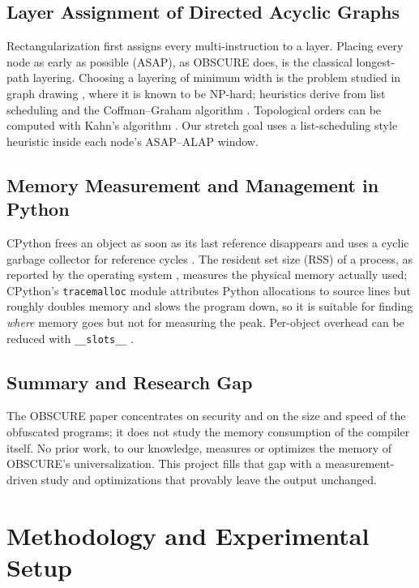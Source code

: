 \documentclass[12pt,a4paper,oneside]{report}
\newcommand{\code}[1]{\texttt{#1}}
\begin{document}
\section{Layer Assignment of Directed Acyclic Graphs}
Rectangularization first assigns every multi-instruction to a layer. Placing every node as early
as possible (ASAP), as OBSCURE does, is the classical longest-path layering. Choosing a layering of
minimum width is the problem studied in graph drawing \cite{sugiyama, healy}, where it is known to
be NP-hard; heuristics derive from list scheduling \cite{graham} and the Coffman--Graham algorithm
\cite{coffman}. Topological orders can be computed with Kahn's algorithm \cite{kahn}. Our stretch
goal uses a list-scheduling style heuristic inside each node's ASAP--ALAP window.

\section{Memory Measurement and Management in Python}
CPython frees an object as soon as its last reference disappears and uses a cyclic garbage
collector for reference cycles \cite{pygc}. The resident set size (RSS) of a process, as reported
by the operating system \cite{getrusage, procfs}, measures the physical memory actually used;
CPython's \code{tracemalloc} module \cite{tracemalloc} attributes Python allocations to source
lines but roughly doubles memory and slows the program down, so it is suitable for finding
\emph{where} memory goes but not for measuring the peak. Per-object overhead can be reduced with
\code{\_\_slots\_\_} \cite{pyslots}.

\section{Summary and Research Gap}
The OBSCURE paper concentrates on security and on the size and speed of the obfuscated programs; it
does not study the memory consumption of the compiler itself. No prior work, to our knowledge,
measures or optimizes the memory of OBSCURE's universalization. This project fills that gap with a
measurement-driven study and optimizations that provably leave the output unchanged.

\chapter{Methodology and Experimental Setup}
\end{document}
